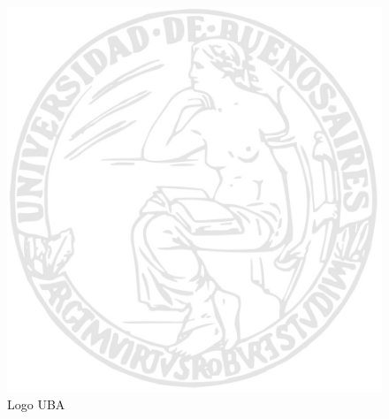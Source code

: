 \documentclass{article}
\begin{document}
\begin{figure}
  \includegraphics{logo_uba}
  \caption{Logo UBA}
  \label{fig:logo_uba}
\end{figure}
\end{document}
